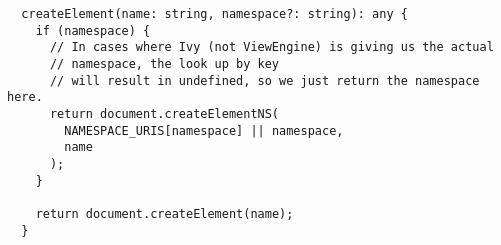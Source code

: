 \begin{verbatim}
  createElement(name: string, namespace?: string): any {
    if (namespace) {
      // In cases where Ivy (not ViewEngine) is giving us the actual
      // namespace, the look up by key
      // will result in undefined, so we just return the namespace here.
      return document.createElementNS(
        NAMESPACE_URIS[namespace] || namespace,
        name
      );
    }

    return document.createElement(name);
  }
\end{verbatim}
